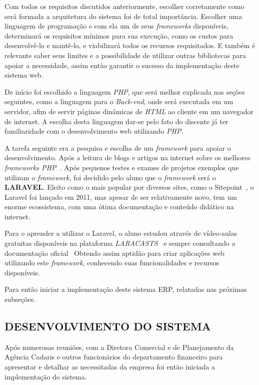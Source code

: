 \documentclass[
  12pt,				%
  openany,
  oneside,
  a4paper,			%
  english,			%
  brazil
]{article}
\numberwithin{figure}{section}
\numberwithin{table}{section}
\begin{document}
Com todos os requisitos discutidos anteriormente, escolher corretamente como será formada a arquitetura do sistema foi de total importância. Escolher uma linguagem de programação e com ela um de seus \textit{frameworks} disponíveis, determinará os requisitos mínimos para sua execução, como os custos para desenvolvê-lo e mantê-lo, e viabilizará todos os recursos requisitados. E também é relevante saber seus limites e a possibilidade de utilizar outras bibliotecas para apoiar a necessidade, assim então garantir o sucesso da implementação deste sistema web.

De início foi escolhido a linguagem \textit{PHP}, que será melhor explicada nas seções seguintes, como a linguagem para o \textit{Back-end}, onde será executada em um servidor, afim de servir páginas dinâmicas de \textit{HTML} ao cliente em um navegador de internet. A escolha desta linguagem dar-se pelo fato do discente já ter familiaridade com o desenvolvimento web utilizando \textit{PHP}.

A tarefa seguinte era a pesquisa e escolha de um \textit{framework} para apoiar o desenvolvimento. Após a leitura de blogs e artigos na internet sobre os melhores \textit{frameworks PHP}~\cite{top10}. Após pequenos testes e exames de projetos exemplos que utilizam o \textit{framework}, foi decidido pelo aluno que o \textit{framework} será o \textbf{LARAVEL}. Eleito como o mais popular por diversos sites, como o Sitepoint~\cite{sitepoint}, o Laravel foi lançado em 2011, mas apesar de ser relativamente novo, tem um enorme ecossistema, com uma ótima documentação e conteúdo didático na internet.

Para o aprender a utilizar o Laravel, o aluno estudou através de vídeo-aulas gratuitas disponíveis na plataforma \textit{LARACASTS}~\cite{laracast} e sempre consultando a documentação oficial~\cite{laraveldocs} Obtendo assim aptidão para criar aplicações web utilizando este \textit{framework}, conhecendo suas funcionalidades e recursos disponíveis.

Para então iniciar a implementação deste sistema ERP, relatadas nas próximas subseções.


\subsection{DESENVOLVIMENTO DO SISTEMA}

Após numerosas reuniões, com a Diretora Comercial e de Planejamento da Agência Cadaris e outros funcionários do departamento financeiro para apresentar e detalhar as necessitadas da empresa foi então iniciada a implementação do sistema. 
\end{document}

